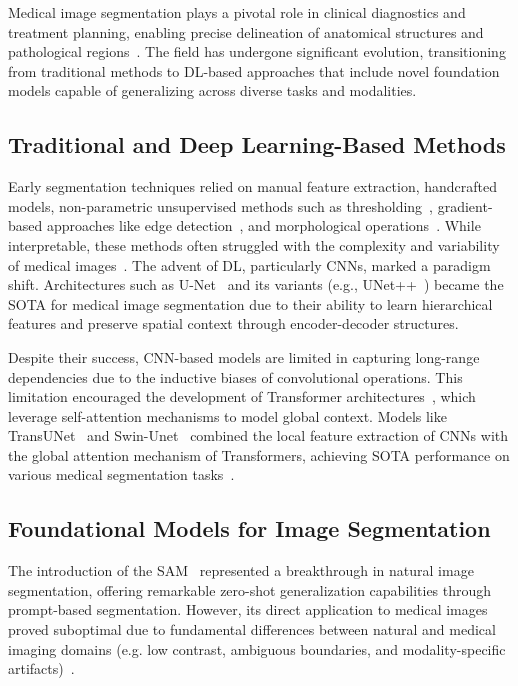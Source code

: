 \documentclass[runningheads]{llncs}
\begin{document}
Medical image segmentation plays a pivotal role in clinical
diagnostics and treatment planning, enabling precise delineation of
anatomical structures and pathological
regions~\cite{Berrezueta2025}. The field has undergone significant
evolution, transitioning from traditional methods to \ac{DL}-based
approaches that include novel foundation models capable of
generalizing across diverse tasks and modalities.

\subsection{Traditional and Deep Learning-Based Methods}

Early segmentation techniques relied on manual feature extraction,
handcrafted models, non-parametric unsupervised methods such as
thresholding~\cite{otsu1979}, gradient-based approaches like edge
detection~\cite[pp.~716-722]{gonzales2018digital}, and morphological
operations~\cite{Yao2023}. While interpretable, these methods often
struggled with the complexity and variability of medical images~\cite{Yao2023}. The
advent of \ac{DL}, particularly \ac{CNNs}, marked a paradigm
shift. Architectures such as U-Net~\cite{RonnebergerFB15} and its
variants (e.g., UNet++~\cite{zhou2018unetplusplus}) became the
\ac{SOTA} for medical image segmentation due to their ability to learn
hierarchical features and preserve spatial context through
encoder-decoder structures.


Despite their success, \ac{CNN}-based models are limited in capturing
long-range dependencies due to the inductive biases of convolutional
operations. This limitation encouraged the development of Transformer
architectures~\cite{vaswani2017attention}, which leverage
self-attention mechanisms to model global context. Models like
TransUNet~\cite{chen2021transunet} and
Swin-Unet~\cite{cao2022swinunet} combined the local feature extraction
of \ac{CNNs} with the global attention mechanism of Transformers, achieving
\ac{SOTA} performance on various medical segmentation
tasks~\cite{Yao2023}.


\subsection{Foundational Models for Image Segmentation}
\label{sec:found-models-image}
The introduction of the \ac{SAM}~\cite{Kirillov2023}
represented a breakthrough in natural image segmentation, offering
remarkable zero-shot generalization capabilities through prompt-based
segmentation. However, its direct application to medical images proved
suboptimal due to fundamental differences between natural and medical
imaging domains (e.g. low contrast, ambiguous boundaries, and
modality-specific artifacts)~\cite{Ma2024,Berrezueta2025}.
\end{document}
